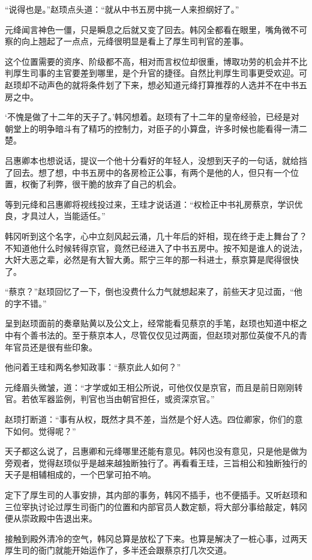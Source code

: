 “说得也是。”赵顼点头道：“就从中书五房中挑一人来担纲好了。”

元绛闻言神色一僵，只是瞬息之后就又变了回去。韩冈全都看在眼里，嘴角微不可察的向上翘起了一点点，元绛很明显是看上了厚生司判官的差事。

这个位置需要的资序、阶级都不高，相对而言权位却很重，博取功劳的机会并不比判厚生司事的主官要差到哪里，是个升官的捷径。自然比判厚生司事更受欢迎。可赵顼却不动声色的就将条件划了下来，想必知道元绛打算推荐的人选并不在中书五房之中。

‘不愧是做了十二年的天子了。’韩冈想着。赵顼有了十二年的皇帝经验，已经是对朝堂上的明争暗斗有了精巧的控制力，对臣子的小算盘，许多时候也能看得一清二楚。

吕惠卿本也想说话，提议一个他十分看好的年轻人，没想到天子的一句话，就给挡了回去。想了想，中书五房中的各房检正公事，有两个是他的人，但只有一个位置，权衡了利弊，很干脆的放弃了自己的机会。

等到元绛和吕惠卿将视线投过来，王珪才说话道：“权检正中书礼房蔡京，学识优良，才具过人，当能适任。”

韩冈听到这个名字，心中立刻风起云涌，几十年后的奸相，现在终于走上舞台了？不知道他什么时候转得京官，竟然已经进入了中书五房中。按不知是谁人的说法，大奸大恶之辈，必然是有大智大勇。熙宁三年的那一科进士，蔡京算是爬得很快了。

“蔡京？”赵顼回忆了一下，倒也没费什么力气就想起来了，前些天才见过面，“他的字不错。”

呈到赵顼面前的奏章贴黄以及公文上，经常能看见蔡京的手笔，赵顼也知道中枢之中有个善书法的。至于蔡京本人，尽管仅仅见过两面，但赵顼对那位英俊不凡的青年官员还是很有些印象。

他问着王珪和两名参知政事：“蔡京此人如何？”

元绛眉头微皱，道：“才学或如王相公所说，可他仅仅是京官，而且是前日刚刚转官。若依军器监例，判官也当由朝官担任，或资深京官。”

赵顼打断道：“事有从权，既然才具不差，当然是个好人选。四位卿家，你们的意下如何。觉得呢？”

天子都这么说了，吕惠卿和元绛哪里还能有意见。韩冈也没有意见，只是他是做为旁观者，觉得赵顼似乎是越来越独断独行了。再看看王珪，三旨相公和独断独行的天子是相辅相成的，一个巴掌可拍不响。

定下了厚生司的人事安排，其内部的事务，韩冈不插手，也不便插手。又听赵顼和三位宰执讨论过厚生司衙门的位置和内部官员人数定额，将大部分事给敲定，韩冈便从崇政殿中告退出来。

接触到殿外清冷的空气，韩冈总算是放松了下来。也算是解决了一桩心事，过两天厚生司的衙门就能开始运作了，多半还会跟蔡京打几次交道。

